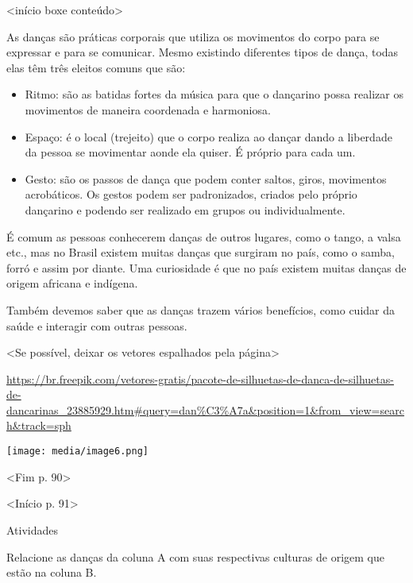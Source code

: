 {{{{{{{{{{{\textless{}início boxe conteúdo\textgreater{}

As danças são práticas corporais que utiliza os movimentos do corpo para
se expressar e para se comunicar. Mesmo existindo diferentes tipos de
dança, todas elas têm três eleitos comuns que são:

\begin{itemize}
\item
  Ritmo: são as batidas fortes da música para que o dançarino possa
  realizar os movimentos de maneira coordenada e harmoniosa.
\item
  Espaço: é o local (trejeito) que o corpo realiza ao dançar dando a
  liberdade da pessoa se movimentar aonde ela quiser. É próprio para
  cada um.
\item
  Gesto: são os passos de dança que podem conter saltos, giros,
  movimentos acrobáticos. Os gestos podem ser padronizados, criados pelo
  próprio dançarino e podendo ser realizado em grupos ou
  individualmente.
\end{itemize}

É comum as pessoas conhecerem danças de outros lugares, como o tango, a
valsa etc., mas no Brasil existem muitas danças que surgiram no país,
como o samba, forró e assim por diante. Uma curiosidade é que no país
existem muitas danças de origem africana e indígena.

Também devemos saber que as danças trazem vários benefícios, como cuidar
da saúde e interagir com outras pessoas.

\textless{}Se possível, deixar os vetores espalhados pela
página\textgreater{}

\url{https://br.freepik.com/vetores-gratis/pacote-de-silhuetas-de-danca-de-silhuetas-de-dancarinas_23885929.htm\#query=dan\%C3\%A7a\&position=1\&from_view=search\&track=sph}

\texttt{[image: media/image6.png]}

\textless{}Fim p. 90\textgreater{}

\textless{}Início p. 91\textgreater{}

Atividades

\num{} Relacione as danças da coluna A com suas respectivas culturas de
  origem que estão na coluna B.

}}}}}}}}}}}
